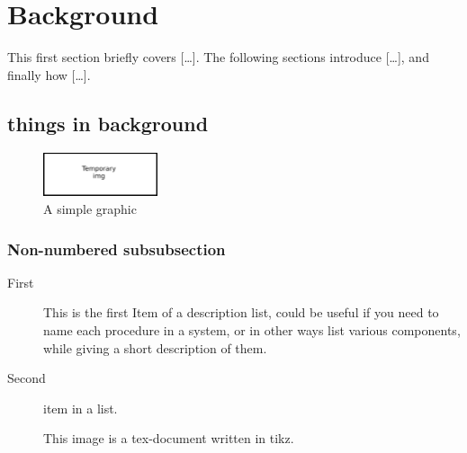 \section{Background}
\label{sec:background}

This first section briefly covers [\dots]. The following sections introduce [\dots], and finally how [\dots].

\subsection{things in background}
\label{sec:thing1}


\lipsum[1]


\begin{figure}[h]
	\centering
	\includegraphics[width=0.3\textwidth]{resources/temp.png}
	\caption{A simple graphic}
	\label{fig:simple}	
\end{figure}


\subsubsection*{Non-numbered subsubsection}


\begin{description}
	\item [First] This is the first Item of a description list, could be useful if you need to name each procedure in a system, or in other ways list various components, while giving a short description of them.

	\item [Second] item in a list.
	

\end{description}

\lipsum[5]

\pagebreak


\begin{figure}[htb]
	\centering
	\resizebox{\textwidth}{!}{}
	\caption{This image is a tex-document written in tikz.}
	\label{fig:tikz}
\end{figure}

\lipsum[2-4]

\pagebreak